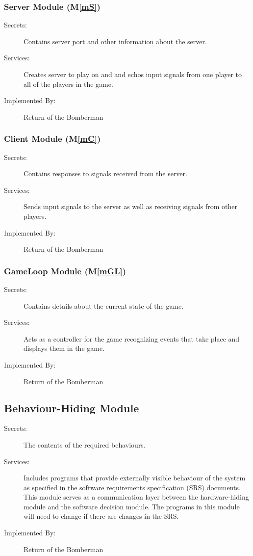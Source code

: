 \documentclass[12pt, titlepage]{article}
\newcommand{\mref}[1]{M\ref{#1}}
\begin{document}
\subsubsection{Server Module (\mref{mS})}

\begin{description}
\item[Secrets:] Contains server port and other information about the server.
\item[Services:] Creates server to play on and and echos input signals from one player to all of the players in the game.
\item[Implemented By:] Return of the Bomberman
\end{description}

\subsubsection{Client Module (\mref{mC})}

\begin{description}
\item[Secrets:] Contains responses to signals received from the server.
\item[Services:] Sends input signals to the server as well as receiving signals from other players. 
\item[Implemented By:] Return of the Bomberman
\end{description}

\subsubsection{GameLoop Module (\mref{mGL})}

\begin{description}
\item[Secrets:] Contains details about the current state of the game.
\item[Services:] Acts as a controller for the game recognizing events that take place and displays them in the game.
\item[Implemented By:] Return of the Bomberman
\end{description}


\subsection{Behaviour-Hiding Module}

\begin{description}
\item[Secrets:]The contents of the required behaviours.
\item[Services:]Includes programs that provide externally visible behaviour of
  the system as specified in the software requirements specification (SRS)
  documents. This module serves as a communication layer between the
  hardware-hiding module and the software decision module. The programs in this
  module will need to change if there are changes in the SRS.
\item[Implemented By:] Return of the Bomberman
\end{description}
\end{document}
